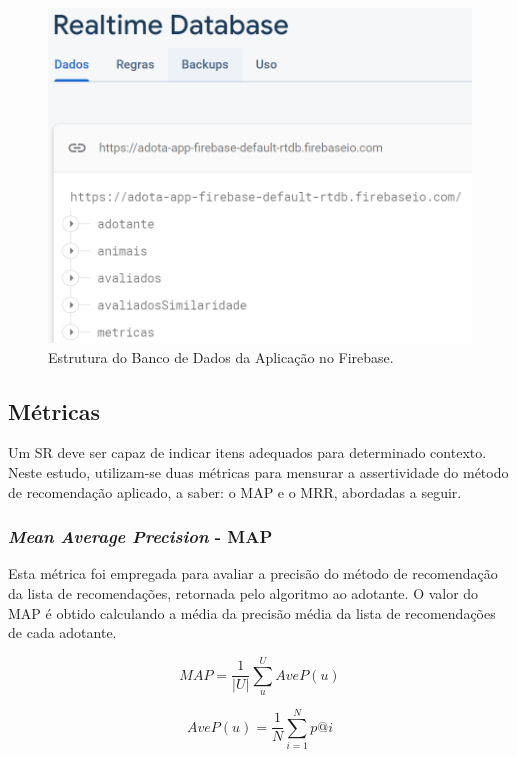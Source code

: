 \documentclass[portuguese]{textolivre}
\begin{document}
\begin{figure}[H]
	\centering
	\includegraphics[scale=0.70]{imagens/fig-017.png} 
	\caption{Estrutura do Banco de Dados da Aplicação no Firebase.}
	\label{fig:017}
\end{figure}

\subsection{Métricas}

Um SR deve ser capaz de indicar itens adequados para determinado contexto. Neste estudo, utilizam-se duas métricas para mensurar a assertividade do método de recomendação aplicado, a saber: o MAP e o MRR, abordadas a seguir. 

\subsubsection{\textit{Mean Average Precision} - MAP}
Esta métrica foi empregada para avaliar a precisão do método de recomendação da lista de recomendações, retornada pelo algoritmo ao adotante. O valor do MAP é obtido calculando a média da precisão média da lista de recomendações de cada adotante.

\begin{equation}
    \label{eqn: map-1}
    MAP = \frac{1}{|U|}\sum_{u}^{U}AveP(u)
\end{equation}

\begin{equation}
    \label{eqn: map-2}
   AveP(u)=\frac{1}{N}\sum_{i=1}^{N}p@i
\end{equation}
\end{document}
